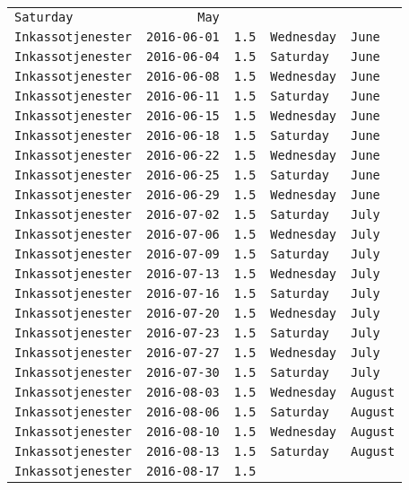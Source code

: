 \documentclass[11pt,A4paper,]{article}
\begin{document}
\begin{longtable}[]{@{}lrrll@{}}
\texttt{Saturday} & \texttt{May}\tabularnewline
\texttt{Inkassotjenester} & \texttt{2016-06-01} & \texttt{1.5} &
\texttt{Wednesday} & \texttt{June}\tabularnewline
\texttt{Inkassotjenester} & \texttt{2016-06-04} & \texttt{1.5} &
\texttt{Saturday} & \texttt{June}\tabularnewline
\texttt{Inkassotjenester} & \texttt{2016-06-08} & \texttt{1.5} &
\texttt{Wednesday} & \texttt{June}\tabularnewline
\texttt{Inkassotjenester} & \texttt{2016-06-11} & \texttt{1.5} &
\texttt{Saturday} & \texttt{June}\tabularnewline
\texttt{Inkassotjenester} & \texttt{2016-06-15} & \texttt{1.5} &
\texttt{Wednesday} & \texttt{June}\tabularnewline
\texttt{Inkassotjenester} & \texttt{2016-06-18} & \texttt{1.5} &
\texttt{Saturday} & \texttt{June}\tabularnewline
\texttt{Inkassotjenester} & \texttt{2016-06-22} & \texttt{1.5} &
\texttt{Wednesday} & \texttt{June}\tabularnewline
\texttt{Inkassotjenester} & \texttt{2016-06-25} & \texttt{1.5} &
\texttt{Saturday} & \texttt{June}\tabularnewline
\texttt{Inkassotjenester} & \texttt{2016-06-29} & \texttt{1.5} &
\texttt{Wednesday} & \texttt{June}\tabularnewline
\texttt{Inkassotjenester} & \texttt{2016-07-02} & \texttt{1.5} &
\texttt{Saturday} & \texttt{July}\tabularnewline
\texttt{Inkassotjenester} & \texttt{2016-07-06} & \texttt{1.5} &
\texttt{Wednesday} & \texttt{July}\tabularnewline
\texttt{Inkassotjenester} & \texttt{2016-07-09} & \texttt{1.5} &
\texttt{Saturday} & \texttt{July}\tabularnewline
\texttt{Inkassotjenester} & \texttt{2016-07-13} & \texttt{1.5} &
\texttt{Wednesday} & \texttt{July}\tabularnewline
\texttt{Inkassotjenester} & \texttt{2016-07-16} & \texttt{1.5} &
\texttt{Saturday} & \texttt{July}\tabularnewline
\texttt{Inkassotjenester} & \texttt{2016-07-20} & \texttt{1.5} &
\texttt{Wednesday} & \texttt{July}\tabularnewline
\texttt{Inkassotjenester} & \texttt{2016-07-23} & \texttt{1.5} &
\texttt{Saturday} & \texttt{July}\tabularnewline
\texttt{Inkassotjenester} & \texttt{2016-07-27} & \texttt{1.5} &
\texttt{Wednesday} & \texttt{July}\tabularnewline
\texttt{Inkassotjenester} & \texttt{2016-07-30} & \texttt{1.5} &
\texttt{Saturday} & \texttt{July}\tabularnewline
\texttt{Inkassotjenester} & \texttt{2016-08-03} & \texttt{1.5} &
\texttt{Wednesday} & \texttt{August}\tabularnewline
\texttt{Inkassotjenester} & \texttt{2016-08-06} & \texttt{1.5} &
\texttt{Saturday} & \texttt{August}\tabularnewline
\texttt{Inkassotjenester} & \texttt{2016-08-10} & \texttt{1.5} &
\texttt{Wednesday} & \texttt{August}\tabularnewline
\texttt{Inkassotjenester} & \texttt{2016-08-13} & \texttt{1.5} &
\texttt{Saturday} & \texttt{August}\tabularnewline
\texttt{Inkassotjenester} & \texttt{2016-08-17} & \texttt{1.5} &

\end{longtable}
\end{document}
